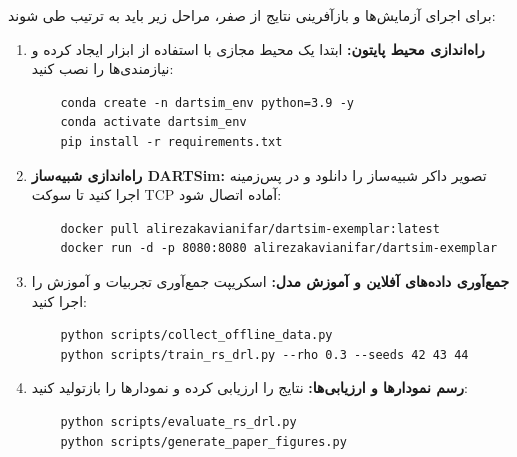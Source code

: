 \documentclass[oneside,openany,a4paper,12pt]{article}
\begin{document}
برای اجرای آزمایش‌ها و بازآفرینی نتایج از صفر، مراحل زیر باید به ترتیب طی شوند:
\begin{enumerate}
    \item \textbf{راه‌اندازی محیط پایتون:} ابتدا یک محیط مجازی با استفاده از ابزار  ایجاد کرده و نیازمندی‌ها را نصب کنید:
    \begin{singlespace}
    \begin{latin}
    \begin{verbatim}
    conda create -n dartsim_env python=3.9 -y
    conda activate dartsim_env
    pip install -r requirements.txt
    \end{verbatim}
    \end{latin}
    \end{singlespace}
    
    \item \textbf{راه‌اندازی شبیه‌ساز DARTSim:} تصویر داکر شبیه‌ساز را دانلود و در پس‌زمینه اجرا کنید تا سوکت TCP آماده اتصال شود:
    \begin{singlespace}
    \begin{latin}
    \begin{verbatim}
    docker pull alirezakavianifar/dartsim-exemplar:latest
    docker run -d -p 8080:8080 alirezakavianifar/dartsim-exemplar
    \end{verbatim}
    \end{latin}
    \end{singlespace}
    
    \item \textbf{جمع‌آوری داده‌های آفلاین و آموزش مدل:} اسکریپت جمع‌آوری تجربیات و آموزش را اجرا کنید:
    \begin{singlespace}
    \begin{latin}
    \begin{verbatim}
    python scripts/collect_offline_data.py
    python scripts/train_rs_drl.py --rho 0.3 --seeds 42 43 44
    \end{verbatim}
    \end{latin}
    \end{singlespace}
    
    \item \textbf{رسم نمودارها و ارزیابی‌ها:} نتایج را ارزیابی کرده و نمودارها را بازتولید کنید:
    \begin{singlespace}
    \begin{latin}
    \begin{verbatim}
    python scripts/evaluate_rs_drl.py
    python scripts/generate_paper_figures.py
    \end{verbatim}
    \end{latin}
    \end{singlespace}
\end{enumerate}
\end{document}
